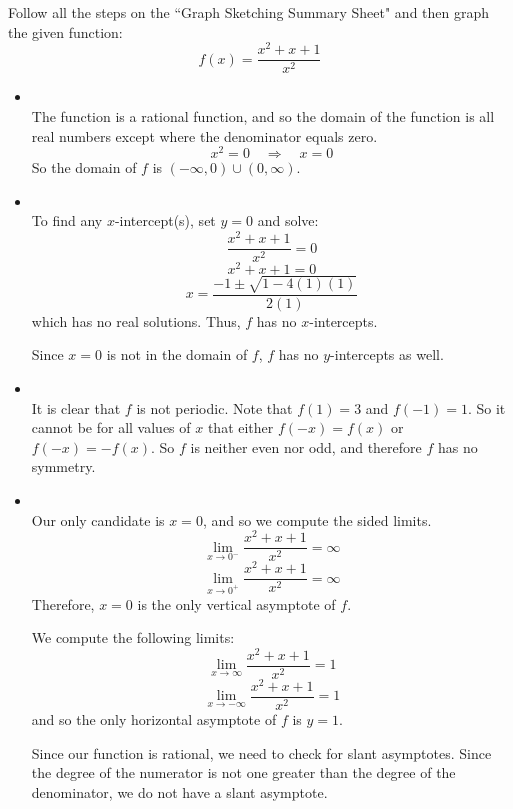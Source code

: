 \documentclass[nooutcomes]{ximera}
\begin{document}
\begin{problem}
Follow all the steps on the ``Graph Sketching Summary Sheet" and then graph the given function:
$$ f(x) = \frac{x^2 + x + 1}{x^2} $$

		\begin{freeResponse}  

		\begin{itemize}
		
			\item  {}  \\
			The function is a rational function, and so the domain of the function is all real numbers except where the denominator equals zero.
			$$ x^2 = 0 \quad \Longrightarrow \quad x=0 $$
			So the domain of $f$ is $(-\infty ,0)\cup (0,\infty )$.
			
			
			
			\item  {}  \\
			To find any $x$-intercept(s), set $y=0$ and solve:
			$$ \frac{x^2 + x + 1}{x^2} = 0 $$
			$$ x^2 + x + 1 = 0 $$
			$$ x = \frac{-1 \pm \sqrt{1-4(1)(1)}}{2(1)} $$
			which has no real solutions.  Thus, $f$ has no $x$-intercepts.
			
			Since $x=0$ is not in the domain of $f$, $f$ has no $y$-intercepts as well.
			
			
			
			\item  {}  \\
			
			It is clear that $f$ is not periodic.  Note that $f(1) = 3$ and $f(-1) = 1$.  So it cannot be for all values of $x$ that either $f(-x) = f(x)$ or $f(-x) = -f(x)$.  So $f$ is neither even nor odd, and therefore $f$ has no symmetry.
			
			\item  {}  \\
			  Our only candidate is $x=0$, and so we compute the sided limits.
			$$ \lim_{x \to 0^-} \frac{x^2+x+1}{x^2} = \infty $$
			$$ \lim_{x \to 0^+} \frac{x^2+x+1}{x^2} = \infty $$
			Therefore, $x=0$ is the only vertical asymptote of $f$.
			
			  We compute the following limits:
			$$ \lim_{x \to \infty} \frac{x^2+x+1}{x^2} = 1 $$
			$$ \lim_{x \to -\infty} \frac{x^2+x+1}{x^2} = 1 $$
			and so the only horizontal asymptote of $f$ is $y=1$.
			
			  Since our function is rational, we need to check for slant asymptotes.  Since the degree of the numerator is not one greater than the degree of the denominator, we do not have a slant asymptote.
			

\end{itemize}
\end{freeResponse}
\end{problem}
\end{document}

